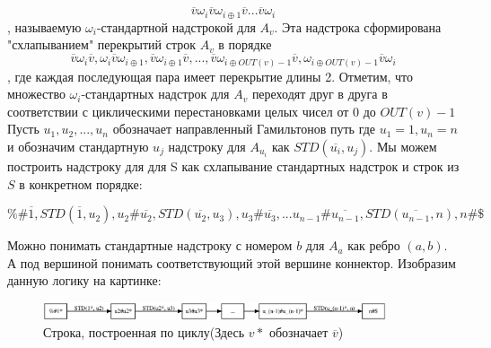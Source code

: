 \documentclass[11pt,a4paper]{article}
\begin{document}
$$\overline{v}\omega_i\overline{v}\omega_{i \oplus 1}\overline{v}...\overline{v}\omega_i$$
, называемую $\omega_i$-стандартной надстрокой для $A_v$.
Эта надстрока сформирована "схлапыванием" перекрытий строк $A_v$ в порядке
$$\overline{v}\omega_i\overline{v}, \omega_i\overline{v}\omega_{i \oplus 1}, \overline{v}\omega_{i \oplus1}\overline{v}, ...,
\overline{v}\omega_{i \oplus OUT(v)-1}\overline{v}, \omega_{i \oplus OUT(v)-1}\overline{v}\omega_i$$
, где каждая последующая пара имеет перекрытие длины 2.
 Отметим, что множество $\omega_i$-стандартных надстрок для $A_v$ переходят друг в друга в соответствии с циклическими перестановками целых чисел от $0$ до $OUT(v) - 1$
Пусть $u_1, u_2, ..., u_n$ обозначает направленный Гамильтонов путь где $u_1 = 1, u_n = n$ и обозначим стандартную $u_j$ надстроку для $A_{u_i}$ как $STD(\overline{u_i}, u_j)$.
Мы можем построить надстроку для для S как схлапывание стандартных надстрок и строк из $S$ в конкретном порядке:

$$\%\#\overline{1}, STD(\overline{1}, u_2), u_2 \# \overline{u_2}, STD(\overline{u_2}, u_3), u_3\#\overline{u_3}, ...
u_{n - 1}\#\overline{u_{n - 1}}, STD(\overline{u_{n - 1}}, n), n\#\$$$

Можно понимать стандартные надстроку с номером $b$ для $A_a$ как ребро $(a, b)$. А под вершиной понимать соответствующий этой вершине коннектор. Изобразим данную логику на картинке:

\begin{figure}[htp]
\begin{center}
  \includegraphics[width=0.9\textwidth]{pict1}
  \caption{Строка, построенная по циклу(Здесь $v*$ обозначает $\overline{v}$)}
  \label{fig:myGraph}
\end{center}
\end{figure}
\end{document}
